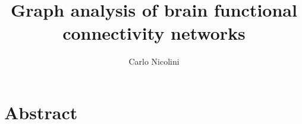 
%

\title{Graph analysis of brain functional connectivity networks}
\author{Carlo Nicolini}

\newtheorem{obs}{Observation}
\newtheorem{props}{Proposition}



\maketitle
{}

\tableofcontents
\listoftodos

%

%

%


\chapter*{Abstract}


% 	

% 	

% 	

